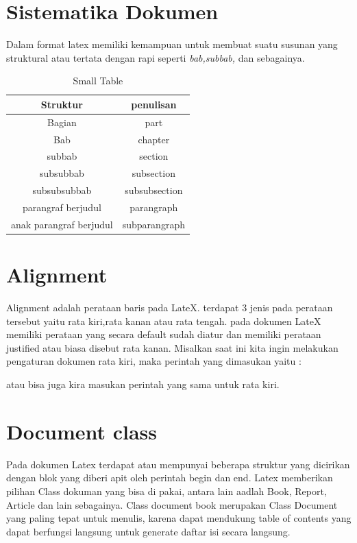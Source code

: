 \section{Sistematika Dokumen}
Dalam format latex memiliki kemampuan untuk membuat suatu susunan yang struktural atau tertata dengan rapi
seperti \textit{bab,subbab,} dan sebagainya.

\begin{table}[h]
\caption{Small Table}
\centering

\begin{tabular}{|c|c|}
\hline
\textbf{Struktur}&\textbf{penulisan}\\
\hline
Bagian&{part}\\
\hline
Bab&{chapter}\\
\hline
subbab&{section}\\
\hline
subsubbab&subsection\\
\hline
subsubsubbab&subsubsection\\
\hline
parangraf berjudul&{parangraph}\\
\hline
anak parangraf berjudul &{subparangraph}\\
\hline
\end{tabular}

\label{table:contoh}
\end{table}
 
\section{Alignment}
Alignment adalah perataan baris pada LateX. terdapat 3 jenis pada perataan tersebut yaitu rata kiri,rata kanan atau rata tengah. pada dokumen LateX memiliki perataan yang secara default sudah diatur dan memiliki perataan justified atau biasa disebut rata kanan.
Misalkan saat ini kita ingin melakukan pengaturan dokumen rata kiri, maka perintah yang dimasukan yaitu :

atau bisa juga kira masukan perintah yang sama untuk rata kiri.


\section{Document class}

Pada dokumen Latex terdapat atau mempunyai beberapa struktur yang dicirikan dengan blok yang diberi apit oleh perintah begin dan end. Latex memberikan pilihan Class dokuman yang bisa di pakai, antara lain aadlah Book, Report, Article dan lain sebagainya. Class document book merupakan Class Document yang paling tepat untuk menulis, karena dapat mendukung table of contents yang dapat berfungsi langsung untuk generate daftar isi secara langsung.


